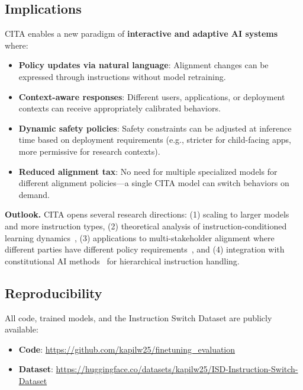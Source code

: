 \vspace{-2mm}
\subsection{Implications}
\label{sec:implications}

CITA enables a new paradigm of \textbf{interactive and adaptive AI systems} where:

\begin{itemize}[leftmargin=*,itemsep=2pt]
    \item \textbf{Policy updates via natural language}: Alignment changes can be expressed through instructions without model retraining.

    \item \textbf{Context-aware responses}: Different users, applications, or deployment contexts can receive appropriately calibrated behaviors.

    \item \textbf{Dynamic safety policies}: Safety constraints can be adjusted at inference time based on deployment requirements (e.g., stricter for child-facing apps, more permissive for research contexts).

    \item \textbf{Reduced alignment tax}: No need for multiple specialized models for different alignment policies---a single CITA model can switch behaviors on demand.
\end{itemize}

\textbf{Outlook.} CITA opens several research directions: (1) scaling to larger models~\cite{touvron2023llama,jiang2023mistral,team2023gemini,chowdhery2022palm} and more instruction types, (2) theoretical analysis of instruction-conditioned learning dynamics~\cite{azar2023general}, (3) applications to multi-stakeholder alignment where different parties have different policy requirements~\cite{sun2024trustllm}, and (4) integration with constitutional AI methods~\cite{bai2022constitutional} for hierarchical instruction handling.

\vspace{-2mm}
\subsection{Reproducibility}
\label{sec:reproducibility}

All code, trained models, and the Instruction Switch Dataset are publicly available:

\begin{itemize}[leftmargin=*,itemsep=1pt]
    \item \textbf{Code}: \url{https://github.com/kapilw25/finetuning_evaluation}
    \item \textbf{Dataset}: \url{https://huggingface.co/datasets/kapilw25/ISD-Instruction-Switch-Dataset}
\end{itemize}
